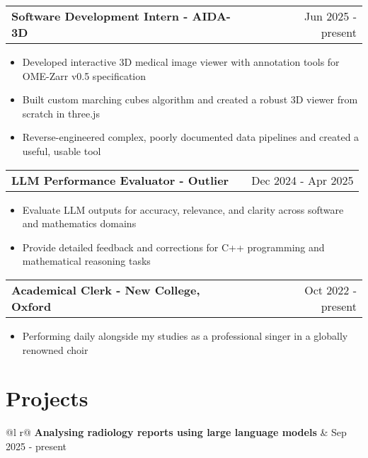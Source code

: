 \documentclass[a4paper,10pt]{article}
\makeatletter
\newenvironment{joblong}[2]
    {
    \begin{tabularx}{\linewidth}{@{}l X r@{}}
    \textbf{#1} & \hfill &  #2 \\[4pt]
    \end{tabularx}
    \begin{minipage}[t]{\linewidth}
    \begin{itemize}[nosep,after=\strut, leftmargin=1em, itemsep=1pt,label=--]
    }
    {
    \end{itemize}
    \end{minipage}    
    }
\makeatother
\begin{document}
\vspace{6pt}

\begin{joblong}{Software Development Intern - AIDA-3D}{Jun 2025 - present}
\item Developed interactive 3D medical image viewer with annotation tools for OME-Zarr v0.5 specification
\item Built custom marching cubes algorithm and created a robust 3D viewer from scratch in three.js
\item Reverse-engineered complex, poorly documented data pipelines and created a useful, usable tool
\end{joblong}

\vspace{6pt}

\begin{joblong}{LLM Performance Evaluator - Outlier}{Dec 2024 - Apr 2025}
\item Evaluate LLM outputs for accuracy, relevance, and clarity across software and mathematics domains
\item Provide detailed feedback and corrections for C++ programming and mathematical reasoning tasks
\end{joblong}

\vspace{6pt}

\begin{joblong}{Academical Clerk - New College, Oxford}{Oct 2022 - present}
\item Performing daily alongside my studies as a professional singer in a globally renowned choir
\end{joblong}

\section{Projects}

\begin{tabularx}{\linewidth}{ @{}l r@{} }
\textbf{Analysing radiology reports using large language models} & \hfill Sep 2025 - present \\[4pt]
  \\
\end{tabularx}

\vspace{6pt}
\end{document}
